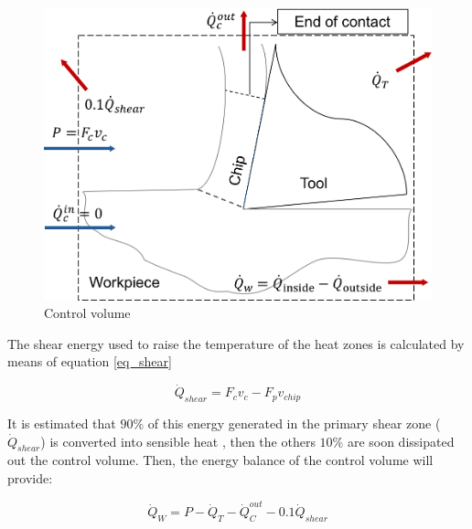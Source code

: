 	\begin{figure}[H]
		\centering
		\captionsetup{justification=centering}
		\includegraphics[scale=0.6]{Imagens/volumeControl.png}
		\caption{Control volume}
		\label{fig:volControl}
	\end{figure}

	The shear energy used to raise the temperature of the heat zones is calculated by means of equation \ref{eq_shear}

	\begin{equation} 
	\label{eq_shear}
	\dot{Q}_{shear} = F_{c}v_{c} - F_{p}v_{chip}
	\end{equation}

	It is estimated that $90\%$ of this energy generated in the primary shear zone ($\dot{Q}_{shear}$) is converted into sensible heat \cite{trigger1942}, then the others $10\%$ are soon dissipated out the control volume. Then, the energy balance of the control volume will provide:

	\begin{equation} 
	\label{eq_energybalance}
	\dot{Q}_{W} = P - \dot{Q}_{T} - \dot{Q}_{C}^{out} - 0.1\dot{Q}_{shear}
	\end{equation}
